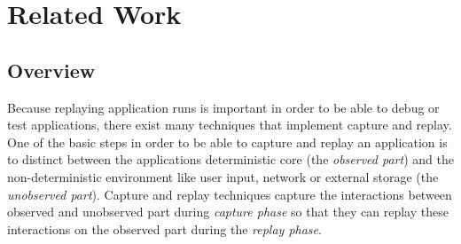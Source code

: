 \chapter{Related Work}

\section{Overview}
Because replaying application runs is important in order to be able to debug or test applications, there exist many techniques that implement capture and replay. One of the basic steps in order to be able to capture and replay an application is to distinct between the applications deterministic core (the \emph{observed part}) and the non-deterministic environment like user input, network or external storage (the \emph{unobserved part}). Capture and replay techniques capture the interactions between observed and unobserved part during \emph{capture phase} so that they can replay these interactions on the observed part during the \emph{replay phase}.

% 

% 

